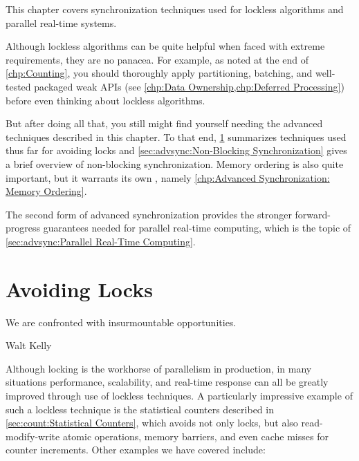 
%

This chapter covers synchronization techniques used for lockless
algorithms and parallel real-time systems.

Although lockless algorithms can be quite helpful when faced with
extreme requirements, they are no panacea.
For example, as noted at the end of \cref{chp:Counting},
you should thoroughly apply partitioning, batching, and
well-tested packaged weak APIs
(see \cref{chp:Data Ownership,chp:Deferred Processing})
before even thinking about lockless algorithms.

But after doing all that, you still might find yourself needing the
advanced techniques described in this chapter.
To that end,
\cref{sec:advsync:Avoiding Locks}
summarizes techniques used thus far for avoiding locks and
\cref{sec:advsync:Non-Blocking Synchronization}
gives a brief overview of non-blocking synchronization.
Memory ordering is also quite important, but it warrants its own
, namely
\cref{chp:Advanced Synchronization: Memory Ordering}.

The second form of advanced synchronization provides the stronger
forward-progress guarantees needed for parallel real-time computing,
which is the topic of
\cref{sec:advsync:Parallel Real-Time Computing}.

\section{Avoiding Locks}
\label{sec:advsync:Avoiding Locks}
%
\epigraph{We are confronted with insurmountable opportunities.}
	 {Walt Kelly}

Although locking is the workhorse of parallelism in production, in
many situations performance, scalability, and real-time response can
all be greatly improved through use of lockless techniques.
A particularly impressive example of such a lockless technique is
the statistical counters described in
\cref{sec:count:Statistical Counters},
which avoids not only locks, but also read-modify-write atomic operations,
memory barriers, and even cache misses for counter increments.
Other examples we have covered include:

